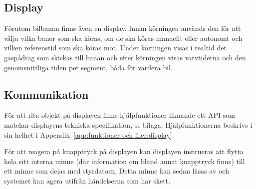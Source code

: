 \subsection{Display}

Förutom bilbanan finns även en display. Innan körningen används den för att
välja vilka banor som ska köras, om de ska köras manuellt eller autonomt och
vilken referenstid som ska köras mot. Under körningen visas i realtid det
gaspådrag som skickas till banan och efter körningen visas varvtiderna och den
genomsnittliga tiden per segment, båda för vardera bil.

\subsection{Kommunikation}

För att rita objekt på displayen finns hjälpfunktioner liknande ett API som
matchar displayens tekniska specifikation, se bilaga. Hjälpfunktionerna beskrivs
i sin helhet i Appendix~\ref{app:funktioner och filer:display}.

För att reagera på knapptryck på displayen kan displayen instrueras att flytta
hela sitt interna minne (där information om bland annat knapptryck finns) till
ett minne som delas med styrdatorn. Detta minne kan sedan läsas av och systemet
kan agera utifrån händelserna som har skett.

